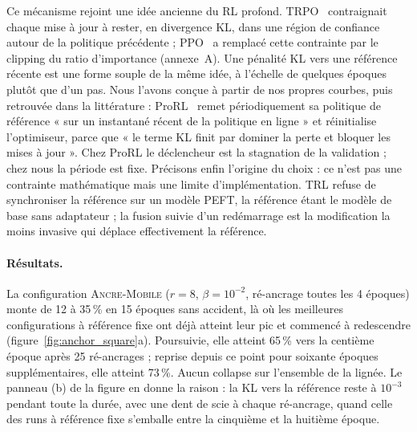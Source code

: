 \documentclass[11pt,a4paper]{article}
\begin{document}
Ce mécanisme rejoint une idée ancienne du RL profond. TRPO~\cite{schulman2015trpo} contraignait chaque mise à jour à rester, en divergence KL, dans une région de confiance autour de la politique précédente ; PPO~\cite{schulman2017proximal} a remplacé cette contrainte par le clipping du ratio d'importance (annexe~A). Une pénalité KL vers une référence récente est une forme souple de la même idée, à l'échelle de quelques époques plutôt que d'un pas. Nous l'avons conçue à partir de nos propres courbes, puis retrouvée dans la littérature : ProRL~\cite{liu2025prorl} remet périodiquement sa politique de référence « sur un instantané récent de la politique en ligne » et réinitialise l'optimiseur, parce que « le terme KL finit par dominer la perte et bloquer les mises à jour ». Chez ProRL le déclencheur est la stagnation de la validation ; chez nous la période est fixe. Précisons enfin l'origine du choix : ce n'est pas une contrainte mathématique mais une limite d'implémentation. TRL refuse de synchroniser la référence sur un modèle PEFT, la référence étant le modèle de base sans adaptateur ; la fusion suivie d'un redémarrage est la modification la moins invasive qui déplace effectivement la référence.

\paragraph{Résultats.} La configuration \textsc{Ancre-Mobile} ($r=8$, $\beta=10^{-2}$, ré-ancrage toutes les 4 époques) monte de 12 à 35\,\% en 15 époques sans accident, là où les meilleures configurations à référence fixe ont déjà atteint leur pic et commencé à redescendre (figure~\ref{fig:anchor_square}a). Poursuivie, elle atteint 65\,\% vers la centième époque après 25 ré-ancrages ; reprise depuis ce point pour soixante époques supplémentaires, elle atteint 73\,\%. Aucun collapse sur l'ensemble de la lignée. Le panneau (b) de la figure en donne la raison : la KL vers la référence reste à $10^{-3}$ pendant toute la durée, avec une dent de scie à chaque ré-ancrage, quand celle des runs à référence fixe s'emballe entre la cinquième et la huitième époque.
\end{document}
